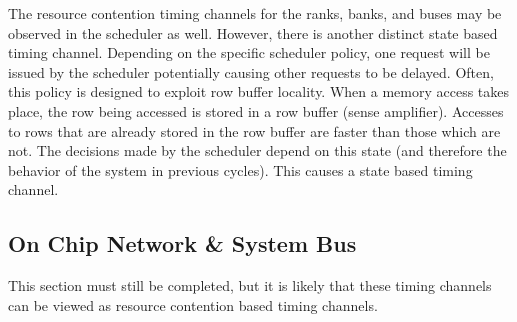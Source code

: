 The resource contention timing channels for the ranks, banks, and buses may be 
observed in the scheduler as well. However, there is another distinct state 
based timing channel. Depending on the specific scheduler policy, one request 
will be issued by the scheduler potentially causing other requests to be 
delayed.  Often, this policy is designed to exploit row buffer locality. When a 
memory access takes place, the row being accessed is stored in a row buffer 
(sense amplifier). Accesses to rows that are already stored in the row buffer 
are faster than those which are not. The decisions made by the scheduler depend 
on this state (and therefore the behavior of the system in previous cycles).  
This causes a state based timing channel.

\subsection{On Chip Network \& System Bus}
This section must still be completed, but it is likely that these timing 
channels can be viewed as resource contention based timing channels.
